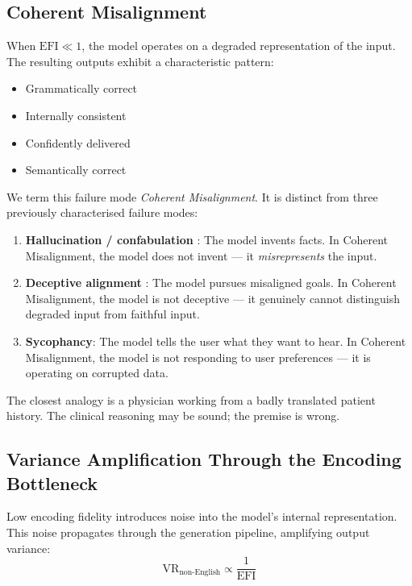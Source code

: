\documentclass[11pt,a4paper]{article}
\begin{document}
\subsection{Coherent Misalignment}

When $\text{EFI} \ll 1$, the model operates on a degraded representation of the input. The resulting outputs exhibit a characteristic pattern:

\begin{itemize}
    \item Grammatically correct \checkmark
    \item Internally consistent \checkmark
    \item Confidently delivered \checkmark
    \item Semantically correct 
\end{itemize}

We term this failure mode \emph{Coherent Misalignment}. It is distinct from three previously characterised failure modes:

\begin{enumerate}
    \item \textbf{Hallucination / confabulation} \citep{ardoin2025}: The model invents facts. In Coherent Misalignment, the model does not invent --- it \emph{misrepresents} the input.
    \item \textbf{Deceptive alignment} \citep{hubinger2019}: The model pursues misaligned goals. In Coherent Misalignment, the model is not deceptive --- it genuinely cannot distinguish degraded input from faithful input.
    \item \textbf{Sycophancy}: The model tells the user what they want to hear. In Coherent Misalignment, the model is not responding to user preferences --- it is operating on corrupted data.
\end{enumerate}

The closest analogy is a physician working from a badly translated patient history. The clinical reasoning may be sound; the premise is wrong.

\subsection{Variance Amplification Through the Encoding Bottleneck}

Low encoding fidelity introduces noise into the model's internal representation. This noise propagates through the generation pipeline, amplifying output variance:
\begin{equation}
    \text{VR}_{\text{non-English}} \propto \frac{1}{\text{EFI}}
\end{equation}
\end{document}
